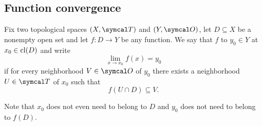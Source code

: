 \subsection{Function convergence}\label{subsec:function_convergence}

\begin{definition}\label{def:convergence_of_function_at_point}
  Fix two topological spaces \( (X, \Cal{T}) \) and \( (Y, \Cal{O}) \), let \( D \subseteq X \) be a nonempty open set and let \( f: D \to Y \) be any function. We say that \( f \)  to \( y_0 \in Y \) at \( x_0 \in \operatorname{cl}(D) \) and write
  \begin{equation*}
    \lim_{x \to x_0} f(x) = y_0
  \end{equation*}
  if for every neighborhood \( V \in \Cal{O} \) of \( y_0 \) there exists a neighborhood \( U \in \Cal{T} \) of \( x_0 \) such that
  \begin{equation*}
    f(U \cap D) \subseteq V.
  \end{equation*}

  Note that \( x_0 \) does not even need to belong to \( D \) and \( y_0 \) does not need to belong to \( f(D) \).
\end{definition}
